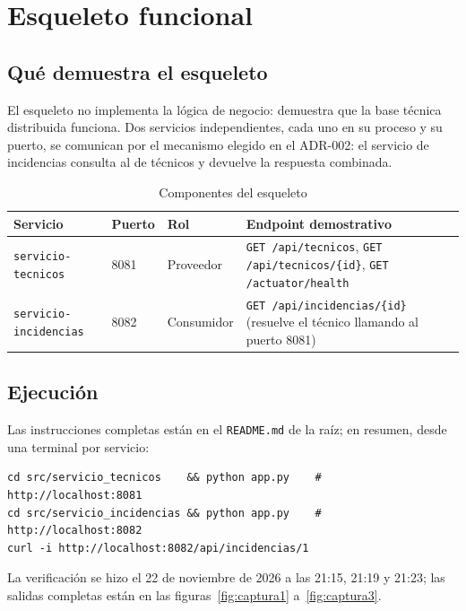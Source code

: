 \section{Esqueleto funcional}

\subsection{Qué demuestra el esqueleto}

El esqueleto no implementa la lógica de negocio: demuestra que la base técnica distribuida
funciona. Dos servicios independientes, cada uno en su proceso y su puerto, se comunican por el
mecanismo elegido en el ADR-002: el servicio de incidencias consulta al de técnicos y devuelve la
respuesta combinada.

\begin{table}[H]
\centering
\caption{Componentes del esqueleto}
\label{tab:esqueleto}
\small
\begin{tabularx}{\linewidth}{@{}lllY@{}}
\toprule
Servicio & Puerto & Rol & Endpoint demostrativo \\
\midrule
\texttt{servicio-tecnicos} & 8081 & Proveedor & \texttt{GET /api/tecnicos}, \texttt{GET /api/tecnicos/\{id\}},
\texttt{GET /actuator/health} \\
\addlinespace
\texttt{servicio-incidencias} & 8082 & Consumidor & \texttt{GET /api/incidencias/\{id\}} (resuelve el
técnico llamando al puerto 8081) \\
\bottomrule
\end{tabularx}
\end{table}

\subsection{Ejecución}

Las instrucciones completas están en el \texttt{README.md} de la raíz; en resumen, desde una
terminal por servicio:

\begin{verbatim}
cd src/servicio_tecnicos    && python app.py    # http://localhost:8081
cd src/servicio_incidencias && python app.py    # http://localhost:8082
curl -i http://localhost:8082/api/incidencias/1
\end{verbatim}

La verificación se hizo el 22 de noviembre de 2026 a las 21:15, 21:19 y 21:23; las salidas completas están en las figuras~\ref{fig:captura1} a~\ref{fig:captura3}.


